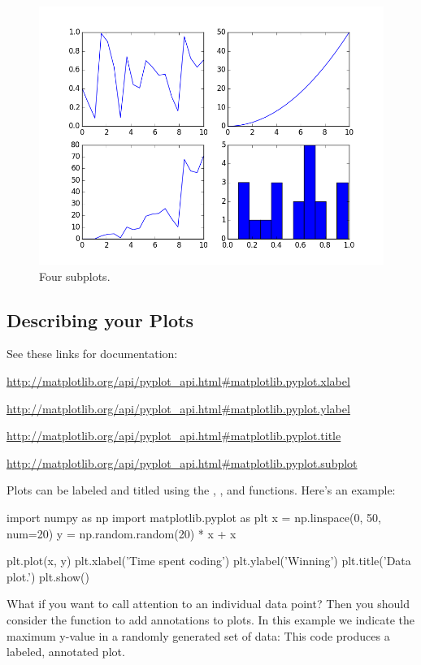 \documentclass[11pt]{cselabheader}
\begin{document}
\begin{figure}[H]
  \centering
  \includegraphics[width=\textwidth]{img/matplotlib_subplot.png}
  \caption{Four subplots.}
\end{figure}

\subsection{Describing your Plots}
See these links for documentation:
\begin{center}
\url{http://matplotlib.org/api/pyplot_api.html#matplotlib.pyplot.xlabel}

\url{http://matplotlib.org/api/pyplot_api.html#matplotlib.pyplot.ylabel}

\url{http://matplotlib.org/api/pyplot_api.html#matplotlib.pyplot.title}

\url{http://matplotlib.org/api/pyplot_api.html#matplotlib.pyplot.subplot}
\end{center}

Plots can be labeled and titled using the
,
,
and  functions.
Here's an example:

\begin{python3code}
import numpy as np
import matplotlib.pyplot as plt
x = np.linspace(0, 50, num=20)
y = np.random.random(20) * x + x

plt.plot(x, y)
plt.xlabel('Time spent coding')
plt.ylabel('Winning')
plt.title('Data plot.')
plt.show()
\end{python3code}

What if you want to call attention to an individual data point? Then
you should consider the  function to add
annotations to plots.  In this example we indicate the maximum y-value
in a randomly generated set of data: This code produces a labeled,
annotated plot.
\end{document}
